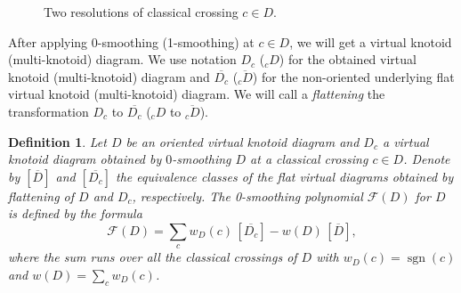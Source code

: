 \documentclass[11pt]{amsart}
\theoremstyle{noparens}
\newtheorem{definition}{Definition}[section]
\numberwithin{equation}{section}
\numberwithin{equation}{section}
\begin{document}
\begin{figure}[!ht]
\begin{center}
\caption{Two resolutions of classical crossing $c \in D$.} \label{fig14}
\end{center}
\end{figure}

After applying 0-smoothing (1-smoothing) at $c \in D$, we will get a virtual knotoid (multi-knotoid) diagram. We use notation $D_c$ (${}_cD$) for the obtained virtual knotoid (multi-knotoid) diagram and $\overline{D_c}$ ($\overline{{}_cD}$) for the non-oriented underlying flat virtual knotoid (multi-knotoid) diagram. We will call a \textit{flattening} the transformation $D_c$ to $\overline{D_{c}}$ (${}_cD$ to $\overline{{}_cD}$). 

\begin{definition}\label{def4.2} {\rm 
Let $D$ be an oriented virtual knotoid diagram and $D_c$ a virtual knotoid diagram obtained by $0$-smoothing $D$ at a classical crossing $c \in D$. Denote by $[\overline{D}]$ and $[\overline{D_c}]$ the equivalence classes of the flat virtual diagrams obtained by flattening of $D$ and $D_c$, respectively. The \textit{0-smoothing polynomial} $\mathcal{F} (D)$ for $D$ is defined by the formula 
\begin{equation}
\mathcal{F} (D) = \sum_{c} w_D(c) \, [\overline{D_c}] - w (D) \, [\overline{D}],  \label{eqn:defF}
\end{equation}
where the sum runs over all the classical crossings of $D$ with $w_D(c) = \operatorname{sgn}(c)$ and $\displaystyle w(D) = \sum_c w_D(c)$. 
    }
\end{definition}
\end{document}
